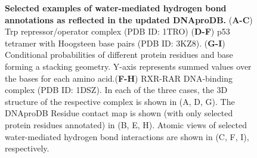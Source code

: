 \begin{center}
    \begin{figure}
        \caption[Water-mediated hydrogen bond annotation in DNAproDB]{\textbf{Selected examples of water-mediated hydrogen bond annotations as reflected in the updated DNAproDB.  } ({\bf A-C}) Trp repressor/operator complex (PDB ID: 1TRO)  ({\bf D-F})    p53 tetramer with Hoogsteen base pairs (PDB ID: 3KZ8). ({\bf G-I}) Conditional probabilities of different protein residues and base forming a stacking geometry. Y-axis represents summed values over the bases for each amino acid.({\bf F-H}) RXR-RAR DNA-binding complex (PDB ID: 1DSZ). In each of the three cases, the 3D structure of the respective complex is shown in (A, D, G). The DNAproDB Residue contact map is shown (with only selected protein residues annotated) in (B, E, H). Atomic views of selected water-mediated hydrogen bond interactions are shown in (C, F, I), respectively. }
  \label{fig:dnaprodb3}
\end{figure}
\end{center}


